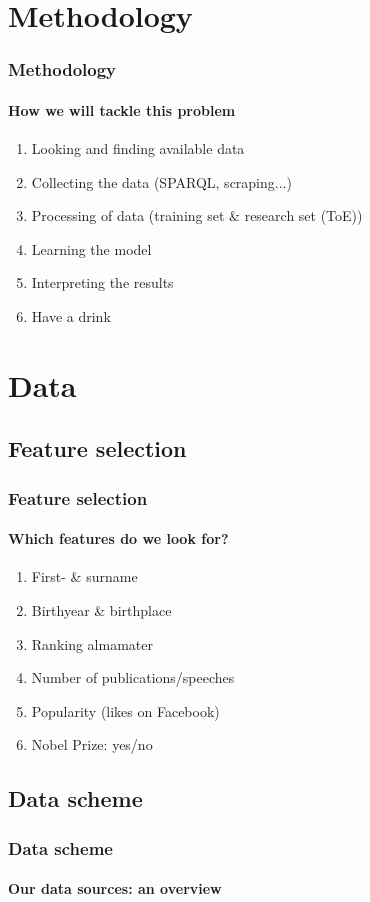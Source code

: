 \documentclass[nonav,sleutel]{beamer}
\begin{document}
\section{Methodology}
\begin{frame}
\frametitle{Methodology}
\framesubtitle{How we will tackle this problem}
\begin{enumerate}
\item<1-> Looking and finding available data
\item<2-> Collecting the data (SPARQL, scraping...)
\item<3-> Processing of data (training set \& research set (ToE))
\item<4-> Learning the model
\item<5-> Interpreting the results
\item<6-> Have a drink
\end{enumerate}
\end{frame}

\section{Data}
\subsection{Feature selection}
\begin{frame}
\frametitle{Feature selection}
\framesubtitle{Which features do we look for?}

\begin{enumerate}
\item<1-> First- \& surname
\item<2-> Birthyear \& birthplace
\item<3-> Ranking almamater
\item<4-> Number of publications/speeches
\item<5-> Popularity (likes on Facebook)
\item<6-> Nobel Prize: yes/no
\end{enumerate}

\end{frame}

\subsection{Data scheme}
\begin{frame}
\frametitle{Data scheme}
\framesubtitle{Our data sources: an overview}

\end{frame}
\end{document}
